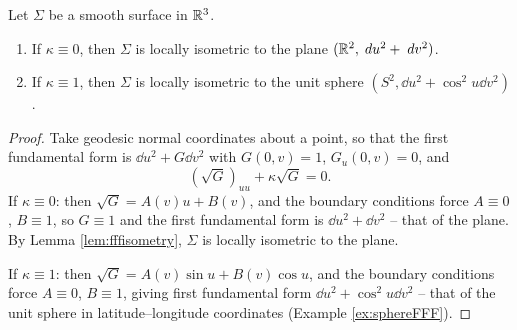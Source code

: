 \documentclass[a4paper]{scrartcl}
\begin{document}
\begin{proposition}
    Let $\Sigma$ be a smooth surface in $\mathbb{R}^3$.
    \begin{enumerate}[label=(\roman*)]
        \item If $\kappa \equiv 0$, then $\Sigma$ is locally isometric to the plane $(\mathbb{R}^2, \; d u^2 + \; d v^2)$.
        \item If $\kappa \equiv 1$, then $\Sigma$ is locally isometric to the unit sphere $(S^2, \dd u^2 + \cos^2 u \dd v^2)$.
    \end{enumerate}
\end{proposition}
\begin{proof}
    Take geodesic normal coordinates about a point, so that the first fundamental form is $\dd u^2 + G \dd v^2$ with $G(0, v) = 1$, $G_u(0, v) = 0$, and
    $$
    \left(\sqrt{G}\right)_{uu} + \kappa \sqrt{G} = 0.
    $$
    If $\kappa \equiv 0$: then $\sqrt{G} = A(v) u + B(v)$, and the boundary conditions force $A \equiv 0$, $B \equiv 1$, so $G \equiv 1$ and the first fundamental form is $\dd u^2 + \dd v^2$ -- that of the plane. By Lemma \ref{lem:fffisometry}, $\Sigma$ is locally isometric to the plane.

    If $\kappa \equiv 1$: then $\sqrt{G} = A(v)\sin u + B(v) \cos u$, and the boundary conditions force $A \equiv 0$, $B \equiv 1$, giving first fundamental form $\dd u^2 + \cos^2 u \dd v^2$ -- that of the unit sphere in latitude--longitude coordinates (Example \ref{ex:sphereFFF}).
\end{proof}
\end{document}
